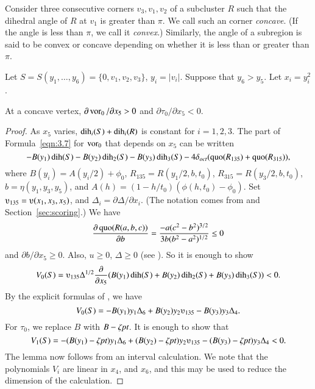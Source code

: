 \begin{definition}\label{def:concave}
Consider three consecutive corners $v_3,v_1,v_2$ of a subcluster
$R$ such that the dihedral angle of $R$ at $v_1$ is greater than
$\pi$.  We call such an corner {\it concave}.  (If the angle is
less than $\pi$, we call it {\it convex}.)  Similarly, the angle
of a subregion is said to be convex or concave depending on
whether it is less than or greater than $\pi$.
\end{definition}

Let
    $S=S(y_1,\ldots,y_6)=\{0,v_1,v_2,v_3\}$, $y_i=|v_i|$.
Suppose that $y_6>y_5$.  Let $x_i=y_i^2$.

\begin{lemma}
At a concave vertex, $\partial \operatorname{vor}_0/\partial x_5 >0$ and
    $\partial \tau_0/\partial x_5<0$.
\end{lemma}

\begin{proof}
As $x_5$ varies, $\operatorname{dih}_i(S)+\operatorname{dih}_i(R)$ is constant for $i=1,2,3$. The
part of Formula~\ref{eqn:3.7} for $\operatorname{vor}_0$ that depends on $x_5$ can be
written
    $$-B(y_1)\operatorname{dih}(S)-B(y_2)\operatorname{dih}_2(S)-B(y_3)\operatorname{dih}_3(S)-4\delta_{oct}
        (\operatorname{quo}(R_{135})+\operatorname{quo}(R_{315})),
    $$
where $B(y_i)=A(y_i/2)+\phi_0$, $R_{135}=R(y_1/2,b,t_0)$,
$R_{315}=R(y_3/2,b,t_0)$, $b=\eta(y_1,y_3,y_5)$, and $A(h) =
(1-h/t_0)(\phi(h,t_0)-\phi_0)$. Set $\ups_{135}=\ups(x_1,x_3,x_5)$, and
$\Delta_i = \partial \Delta/\partial x_i$. (The notation comes from
\cite[Sec.~8]{part1} and Section~\ref{sec:scoring}.) We have
    $$\frac{\partial \operatorname{quo}(R(a,b,c))}{\partial b} =
        \frac{-a (c^2-b^2)^{3/2}}{3 b (b^2-a^2)^{1/2}}\le 0
    $$
and $\partial b/\partial x_5\ge0$.  Also, $u\ge0$, $\Delta\ge0$ (see
\cite[Sec.~8]{part1}).  So it is enough to show
    $$V_0(S) = \ups_{135}\Delta^{1/2}
        \frac{\partial}{\partial x_5} (B(y_1)\dih(S)+B(y_2)\dih_2(S)
        + B(y_3)\dih_3(S))< 0.
    $$
By the explicit formulas of \cite[Sec.~8]{part1}, we have
    $$
    V_0(S) = -B(y_1)y_1\Delta_6 + B(y_2)y_2 \ups_{135} - B(y_3)y_3 \Delta_4.
    $$
For $\tau_0$, we replace $B$ with $B-\zeta\hbox{\it pt}$. It is enough to
show that
    $$
    V_1(S) = -(B(y_1)-\zeta\pt)y_1\Delta_6 + (B(y_2)-\zeta\pt)y_2 \ups_{135} -
        (B(y_3)-\zeta\pt)y_3 \Delta_4<0.
    $$
The lemma now follows from an interval calculation.
We note that the polynomials $V_i$
are linear in $x_4$, and $x_6$, and this may be used to reduce the
dimension of the calculation.
\end{proof}

